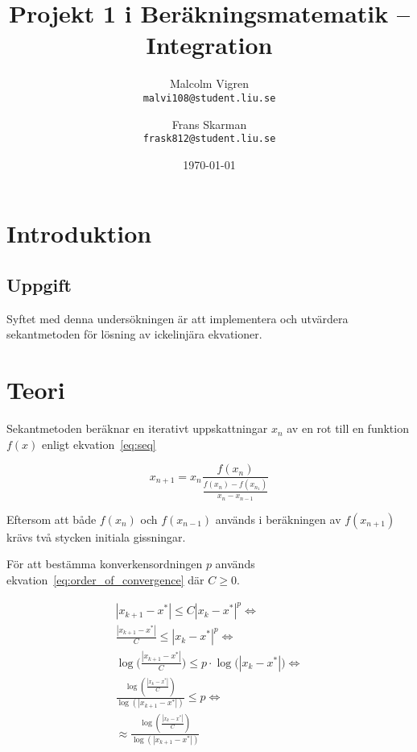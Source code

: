 \documentclass[a4paper,titlepage]{article}
\title{
    \textbf{Projekt 1 i Beräkningsmatematik -- Integration }}
\date{\today}
\author{%
    Malcolm Vigren \\
    \texttt{malvi108@student.liu.se}
    \and
    Frans Skarman\\
    \texttt{frask812@student.liu.se}
    }
\begin{document}
\maketitle
\newpage
\tableofcontents
\newpage

\section{Introduktion}

\subsection{Uppgift}

Syftet med denna undersökningen är att implementera och utvärdera sekantmetoden
för lösning av ickelinjära ekvationer.


\section{Teori}

Sekantmetoden beräknar en iterativt uppskattningar $x_n$ av en rot till en
funktion $f(x)$ enligt ekvation~\ref{eq:seq}

\begin{equation}
    \label{eq:seq}
    x_{n+1} = x_{n}
    \frac{f(x_n)}
        {\frac{f(x_n) - f(x_{n_1})}
                {x_n - x_{n-1}}
        }
\end{equation}

Eftersom att både $f(x_n)$ och $f(x_{n-1})$ används i beräkningen av $f(x_{n+1})$ krävs
två stycken initiala gissningar.


För att bestämma konverkensordningen $p$ används ekvation~\ref{eq:order_of_convergence} där
$C \geq 0$.

\begin{equation}
    \begin{gathered}
        |x_{k+1} - x^*| \leq C |x_k - x^*|^p \Leftrightarrow \\
        \frac{|x_{k+1} - x^*|}{C} \leq |x_{k} - x^*|^p \Leftrightarrow \\
        \log\big(\frac{|x_{k+1} - x^*|}{C} \big) \leq
            p \cdot \log\big(|x_{k} - x^*|\big) \Leftrightarrow \\
        \frac{\log(\frac{|x_{k} - x^*|}{C})}
            {\log(|x_{k+1} - x^*|)} \leq p \Leftrightarrow \\
        \approx \frac{\log(\frac{|x_{k} - x^*|}{C})}
            {\log(|x_{k+1} - x^*|)}
    \end{gathered}
    \label{eq:order_of_convergence}
\end{equation}
\end{document}
